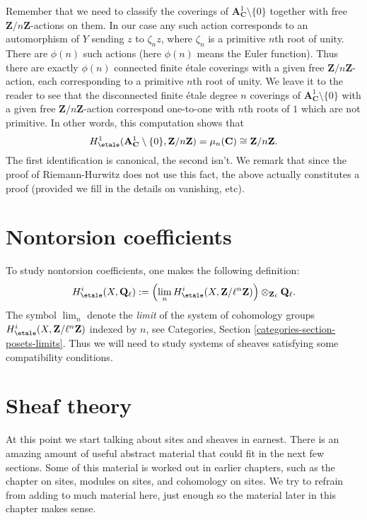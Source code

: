 \medskip\noindent
Remember that we need to classify the coverings of
${\mathbf{A}^1_\mathbf{C} \setminus \{0\}}$ together with free
$\mathbf{Z}/n\mathbf{Z}$-actions on them.
In our case any such action corresponds
to an automorphism of $Y$ sending $z$ to $\zeta_n z$, where $\zeta_n$ is a
primitive $n$th root of unity. There are $\phi(n)$ such actions
(here $\phi(n)$ means the Euler function). Thus there are exactly
$\phi(n)$ connected finite \'etale coverings with a given free
$\mathbf{Z}/n\mathbf{Z}$-action, each corresponding to a primitive
$n$th root of unity. We leave it to the reader to see that the
disconnected finite \'etale degree $n$ coverings of
$\mathbf{A}^1_{\mathbf{C}} \setminus \{0\}$ with a given free
$\mathbf{Z}/n\mathbf{Z}$-action correspond one-to-one with $n$th
roots of $1$ which are not primitive.
In other words, this computation shows that
$$
H_\etale^1 (\mathbf{A}^1_\mathbf{C} \setminus \{0\},
\mathbf{Z}/n\mathbf{Z}) =
\mu_n(\mathbf{C}) \cong \mathbf{Z}/n\mathbf{Z}.
$$
The first identification is canonical, the second isn't. We remark that
since the proof of Riemann-Hurwitz does not use this fact, the above actually
constitutes a proof (provided we fill in the details on vanishing, etc).




\section{Nontorsion coefficients}
\label{section-nontorsion}

\noindent
To study nontorsion coefficients, one makes the following definition:
$$
H_\etale^i (X, \mathbf{Q}_\ell) :=
\left( \lim_n H_\etale^i(X, \mathbf{Z}/\ell^n\mathbf{Z}) \right)
\otimes_{\mathbf{Z}_\ell} \mathbf{Q}_\ell.
$$
The symbol $\lim_n$ denote the {\it limit} of the system of
cohomology groups $H_\etale^i(X, \mathbf{Z}/\ell^n\mathbf{Z})$ indexed
by $n$, see
Categories, Section \ref{categories-section-posets-limits}.
Thus we will need to study systems of sheaves satisfying some compatibility
conditions.




\section{Sheaf theory}
\label{section-sheaf-theory}

\noindent
At this point we start talking about sites and sheaves in earnest.
There is an amazing amount of useful abstract material that could fit
in the next few sections. Some of this material is worked out in earlier
chapters, such as the chapter on sites, modules on sites, and cohomology
on sites. We try to refrain from adding to much material here, just
enough so the material later in this chapter makes sense.




